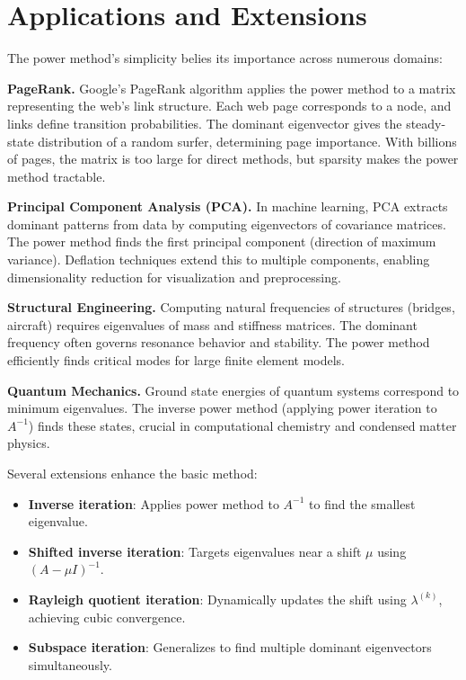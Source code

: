 \documentclass[11pt,a4paper]{article}
\begin{document}
\section{Applications and Extensions}

The power method's simplicity belies its importance across numerous domains:

\textbf{PageRank.} Google's PageRank algorithm applies the power method to a matrix representing the web's link structure. Each web page corresponds to a node, and links define transition probabilities. The dominant eigenvector gives the steady-state distribution of a random surfer, determining page importance. With billions of pages, the matrix is too large for direct methods, but sparsity makes the power method tractable.

\textbf{Principal Component Analysis (PCA).} In machine learning, PCA extracts dominant patterns from data by computing eigenvectors of covariance matrices. The power method finds the first principal component (direction of maximum variance). Deflation techniques extend this to multiple components, enabling dimensionality reduction for visualization and preprocessing.

\textbf{Structural Engineering.} Computing natural frequencies of structures (bridges, aircraft) requires eigenvalues of mass and stiffness matrices. The dominant frequency often governs resonance behavior and stability. The power method efficiently finds critical modes for large finite element models.

\textbf{Quantum Mechanics.} Ground state energies of quantum systems correspond to minimum eigenvalues. The inverse power method (applying power iteration to $A^{-1}$) finds these states, crucial in computational chemistry and condensed matter physics.

Several extensions enhance the basic method:
\begin{itemize}
    \item \textbf{Inverse iteration}: Applies power method to $A^{-1}$ to find the smallest eigenvalue.
    \item \textbf{Shifted inverse iteration}: Targets eigenvalues near a shift $\mu$ using $(A - \mu I)^{-1}$.
    \item \textbf{Rayleigh quotient iteration}: Dynamically updates the shift using $\lambda^{(k)}$, achieving cubic convergence.
    \item \textbf{Subspace iteration}: Generalizes to find multiple dominant eigenvectors simultaneously.
\end{itemize}
\end{document}
